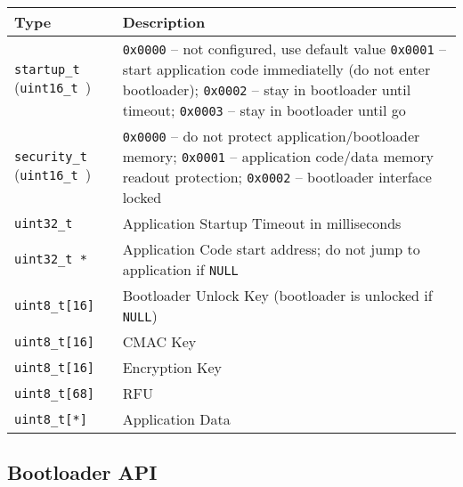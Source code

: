\begin{table*}[!ht]
  \hspace*{-4cm}
  \begin{tabular}{| p{4cm} | p{9cm} | }
      \hline
      \rowcolor{SeaGreen3!30!} {\bf Type} & {\bf Description} \\
      \hline
      \hline
      {\tt startup\_t } \newline ({\tt uint16\_t })  & {\tt 0x0000} -- not configured, use default value\newline
                          {\tt 0x0001} -- start application code immediatelly (do not enter bootloader);\newline
                          {\tt 0x0002} -- stay in bootloader until timeout;\newline 
                          {\tt 0x0003} -- stay in bootloader until go\\
      \hline
      {\tt security\_t } \newline ({\tt uint16\_t }) & {\tt 0x0000} -- do not protect application/bootloader memory;\newline
                           {\tt 0x0001} -- application code/data memory readout protection;\newline
                           {\tt 0x0002} -- bootloader interface locked\\
      \hline
      {\tt uint32\_t}    & Application Startup Timeout in milliseconds \\
      \hline
      {\tt uint32\_t *}  & Application Code start address;\newline
                         do not jump to application if {\tt NULL} \\
      \hline
      {\tt uint8\_t[16]} & Bootloader Unlock Key (bootloader is unlocked if {\tt NULL}) \\
      \hline
      {\tt uint8\_t[16]} & CMAC Key \\
      \hline
      {\tt uint8\_t[16]} & Encryption Key \\
      \hline
      {\tt uint8\_t[68]} & RFU \\
      \hline
      {\tt uint8\_t[*]} & Application Data \\
      \hline
  \end{tabular}
  \label{tab:cfgStruct}
 \end{table*}

 
\clearpage
\subsection{Bootloader API} \label{sec:arch:api}
